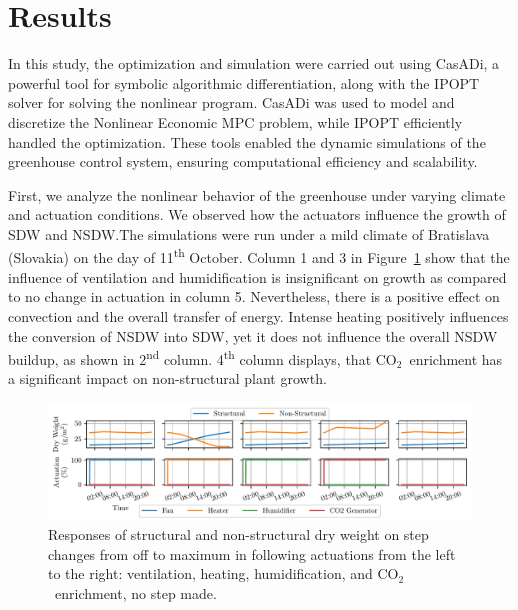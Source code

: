 \documentclass[conference]{IEEEtran}
\newcommand{\coo}{\ensuremath{\mathrm{CO_2}}}
\begin{document}
\section{Results}
In this study, the optimization and simulation were carried out using CasADi\cite{Andersson2019}, a powerful tool for symbolic algorithmic differentiation, along with the IPOPT solver\cite{Wachter2006} for solving the nonlinear program. CasADi was used to model and discretize the Nonlinear Economic MPC problem, while IPOPT efficiently handled the optimization. These tools enabled the dynamic simulations of the greenhouse control system, ensuring computational efficiency and scalability.

First, we analyze the nonlinear behavior of the greenhouse under varying climate and actuation conditions. We observed how the actuators influence the growth of SDW and NSDW.\@ The simulations were run under a mild climate of Bratislava (Slovakia) on the day of 11\textsuperscript{th} October. Column 1 and 3 in Figure~\ref{fig:steps} show that the influence of ventilation and humidification is insignificant on growth as compared to no change in actuation in column 5.
Nevertheless, there is a positive effect on convection and the overall transfer of energy. Intense heating positively influences the conversion of NSDW into SDW, yet it does not influence the overall NSDW buildup, as shown in 2\textsuperscript{nd} column. 4\textsuperscript{th} column displays, that \coo\ enrichment has a significant impact on non-structural plant growth.

\begin{figure}
    \centering
    \includegraphics[width=\textwidth]{figures/step_response-outputs-2024-10-11_2024-10-26-120s.pdf}
    \caption{Responses of structural and non-structural dry weight on step changes from off to maximum in following actuations from the left to the right: ventilation, heating, humidification, and \coo\ enrichment, no step made.}\label{fig:steps}
\end{figure}
\end{document}
